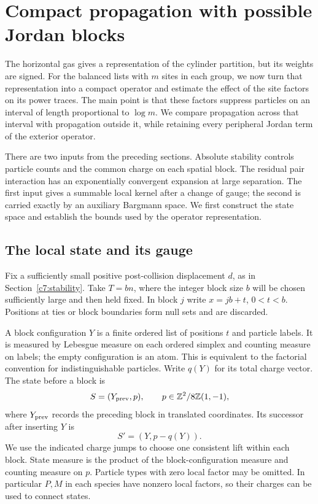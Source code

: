 \section{Compact propagation with possible Jordan blocks}\label{c7:compact}

The horizontal gas gives a representation of the cylinder partition, but
its weights are signed. For the balanced lists with $m$ sites in each
group, we now turn that representation into a compact operator and
estimate the effect of the site factors on its power traces.
The main point is that these factors suppress particles on an interval of
length proportional to $\log m$. We compare propagation across that
interval with propagation outside it, while retaining every peripheral
Jordan term of the exterior operator.

There are two inputs from the preceding sections. Absolute stability
controls particle counts and the common charge on each spatial block.
The residual pair interaction has an exponentially convergent expansion
at large separation. The first input gives a summable local kernel after
a change of gauge; the second is carried exactly by an auxiliary
Bargmann space. We first construct the state space and establish the
bounds used by the operator representation.

\subsection{The local state and its gauge}

Fix a sufficiently small positive post-collision displacement $d$, as
in Section~\ref{c7:stability}. Take $T=bn$, where the integer block size
$b$ will be chosen sufficiently large and then held fixed. In block $j$
write $x=jb+t$, $0<t<b$. Positions at ties or block boundaries form null
sets and are discarded.

A block configuration $Y$ is a finite ordered list of positions $t$ and
particle labels. It is measured by Lebesgue measure on each ordered
simplex and counting measure on labels; the empty configuration is an
atom. This is equivalent to the factorial convention for indistinguishable
particles. Write $q(Y)$ for its total charge vector. The state before a
block is
\[
 S=(Y_{\rm prev},p),\qquad
 p\in\mathbb Z^2/8\mathbb Z(1,-1),
\]
where $Y_{\rm prev}$ records the preceding block in translated
coordinates. Its successor after inserting $Y$ is
\begin{equation}\label{j:successor-state}
 S'=(Y,p-q(Y)).
\end{equation}
We use the indicated charge jumps to choose one consistent lift within
each block. State measure is the product of the block-configuration
measure and counting measure on $p$. Particle types with zero local
factor may be omitted. In particular $P,M$ in each species have nonzero
local factors, so their charges can be used to connect states.


